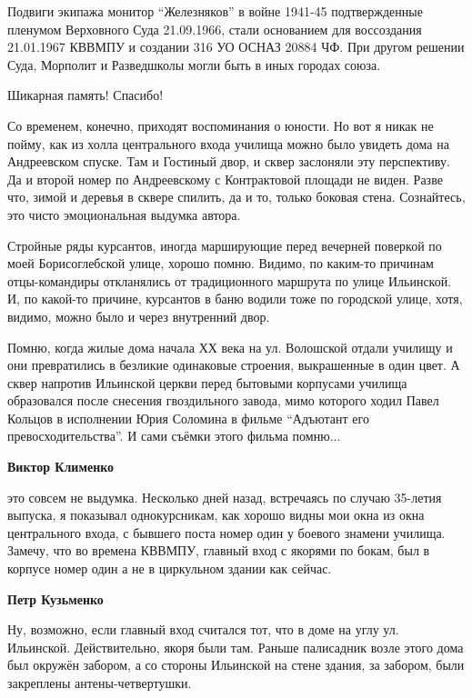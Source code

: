 \begin{itemize}

Подвиги экипажа монитор \enquote{Железняков} в войне 1941-45 подтвержденные пленумом
Верховного Суда 21.09.1966, стали основанием для воссоздания 21.01.1967 КВВМПУ
и создании 316 УО ОСНАЗ 20884 ЧФ. При другом решении Суда, Морполит и
Разведшколы могли быть в иных городах союза.

Шикарная память! Спасибо!


Со временем, конечно, приходят воспоминания о юности. Но вот я никак не пойму,
как из холла центрального входа училища можно было увидеть дома на Андреевском
спуске. Там и Гостиный двор, и сквер заслоняли эту перспективу. Да и второй
номер по Андреевскому с Контрактовой площади не виден. Разве что, зимой и
деревья в сквере спилить, да и то, только боковая стена. Сознайтесь, это чисто
эмоциональная выдумка автора.

Стройные ряды курсантов, иногда марширующие перед вечерней поверкой по моей
Борисоглебской улице, хорошо помню. Видимо, по каким-то причинам отцы-командиры
откланялись от традиционного маршрута по улице Ильинской. И, по какой-то
причине, курсантов в баню водили тоже по городской улице, хотя, видимо, можно
было и через внутренний двор.

Помню, когда жилые дома начала ХХ века на ул. Волошской отдали училищу и они
превратились в безликие одинаковые строения, выкрашенные в один цвет. А сквер
напротив Ильинской церкви перед бытовыми корпусами училища образовался после
снесения гвоздильного завода, мимо которого ходил Павел Кольцов в исполнении
Юрия Соломина в фильме \enquote{Адъютант его превосходительства}. И сами съёмки этого
фильма помню...

\begin{itemize} %
\textbf{Виктор Клименко} 

это совсем не выдумка. Несколько дней назад, встречаясь по случаю 35-летия
выпуска, я показывал однокурсникам, как хорошо видны мои окна из окна
центрального входа, с бывшего поста номер один у боевого знамени училища.
Замечу, что во времена КВВМПУ, главный вход с якорями по бокам, был в корпусе
номер один а не в циркульном здании как сейчас.

\begin{itemize} %
\textbf{Петр Кузьменко}

Ну, возможно, если главный вход считался тот, что в доме на углу ул. Ильинской.
Действительно, якоря были там. Раньше палисадник возле этого дома был окружён
забором, а со стороны Ильинской на стене здания, за забором, были закреплены
антены-четвертушки.


\end{itemize}
\end{itemize}
\end{itemize}
